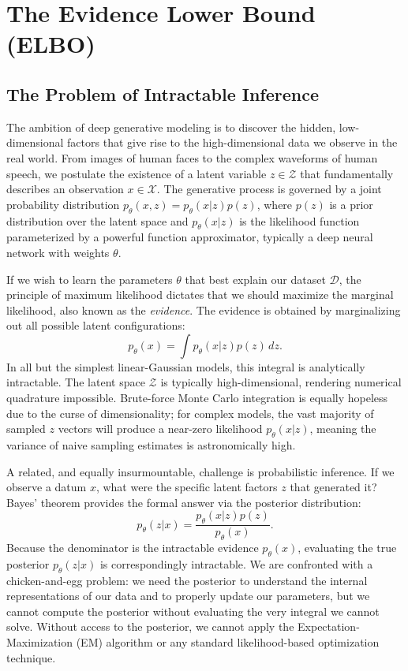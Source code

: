 \chapter{The Evidence Lower Bound (ELBO)}
\label{chap:elbo}

\section{The Problem of Intractable Inference}

The ambition of deep generative modeling is to discover the hidden, low-dimensional factors that give rise to the high-dimensional data we observe in the real world. From images of human faces to the complex waveforms of human speech, we postulate the existence of a latent variable $z \in \mathcal{Z}$ that fundamentally describes an observation $x \in \mathcal{X}$. The generative process is governed by a joint probability distribution $p_\theta(x, z) = p_\theta(x|z)p(z)$, where $p(z)$ is a prior distribution over the latent space and $p_\theta(x|z)$ is the likelihood function parameterized by a powerful function approximator, typically a deep neural network with weights $\theta$.

If we wish to learn the parameters $\theta$ that best explain our dataset $\mathcal{D}$, the principle of maximum likelihood dictates that we should maximize the marginal likelihood, also known as the \textit{evidence}. The evidence is obtained by marginalizing out all possible latent configurations:
\begin{equation}
    p_\theta(x) = \int p_\theta(x|z) p(z) \, dz.
\end{equation}
In all but the simplest linear-Gaussian models, this integral is analytically intractable. The latent space $\mathcal{Z}$ is typically high-dimensional, rendering numerical quadrature impossible. Brute-force Monte Carlo integration is equally hopeless due to the curse of dimensionality; for complex models, the vast majority of sampled $z$ vectors will produce a near-zero likelihood $p_\theta(x|z)$, meaning the variance of naive sampling estimates is astronomically high.

A related, and equally insurmountable, challenge is probabilistic inference. If we observe a datum $x$, what were the specific latent factors $z$ that generated it? Bayes' theorem provides the formal answer via the posterior distribution:
\begin{equation}
    p_\theta(z|x) = \frac{p_\theta(x|z) p(z)}{p_\theta(x)}.
\end{equation}
Because the denominator is the intractable evidence $p_\theta(x)$, evaluating the true posterior $p_\theta(z|x)$ is correspondingly intractable. We are confronted with a chicken-and-egg problem: we need the posterior to understand the internal representations of our data and to properly update our parameters, but we cannot compute the posterior without evaluating the very integral we cannot solve. Without access to the posterior, we cannot apply the Expectation-Maximization (EM) algorithm or any standard likelihood-based optimization technique.

